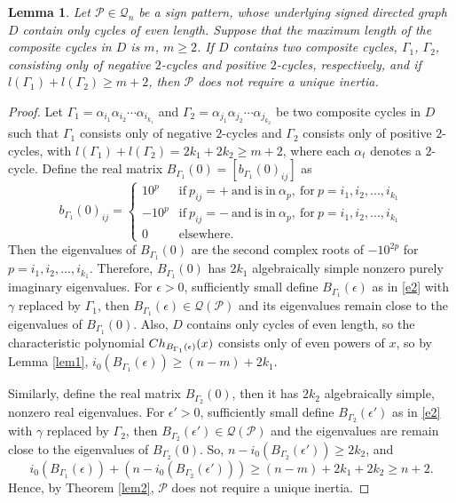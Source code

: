 \documentclass[10pt,a4paper]{amsart}
\newtheorem{lemma}{Lemma}[section]
\numberwithin{equation}{section}
\def\Ch{{\rm Ch}}
\begin{document}
\begin{lemma}\label{xnl2}
	Let $\mathcal{P} \in \mathcal{Q}_n$ be a sign pattern, whose underlying signed directed graph $D$ contain only cycles of even length. Suppose that the maximum length of the composite cycles in $D$ is $m$, $m \geq 2$. If $D$ contains two composite cycles, $\Gamma_1$, $\Gamma_2$, consisting only of negative $2$-cycles and positive $2$-cycles, respectively, and if $l(\Gamma_1)+l(\Gamma_2)\geq m+2$, then $\mathcal{P}$ does not require a unique inertia.
\end{lemma}
\begin{proof}
	Let $\Gamma_1 = \alpha_{i_1} \alpha_{i_2} \cdots \alpha_{i_{k_1}}$ and $\Gamma_2 = \alpha_{j_1} \alpha_{j_2} \cdots \alpha_{j_{k_2}}$ be two composite cycles in $D$ such that $\Gamma_1$ consists only of negative $2$-cycles and $\Gamma_2$ consists only of positive $2$-cycles, with $l(\Gamma_1)+l(\Gamma_2)=2k_1+2k_2\geq m+2$, where each $\alpha_t$ denotes a $2$-cycle.   Define the real matrix $B_{\Gamma_1}(0)=[b_{\Gamma_1}(0)_{ij}]$ as
	$$b_{\Gamma_1}(0)_{ij}= \begin{cases}
		10^p & \text{if}\ p_{ij}=+~\text{and}~ \text{is}~
		\text{in}~ \alpha_p,~\text{for}~p=i_1,i_2,...,i_{k_1} \\
		-10^p & \text{if}\ p_{ij}=-~\text{and}~ \text{is}~ \text{in}~ \alpha_p,~\text{for}~p=i_1,i_2,...,i_{k_1} \\
		
		0 & \text{elsewhere.}
	\end{cases}$$
	Then the eigenvalues of $B_{\Gamma_1}(0)$ are the second complex roots of $-10^{2p}$ for $p=i_1,i_2,...,i_{k_1}$. Therefore, %
	$B_{\Gamma_1}(0)$ has $2k_1$ algebraically simple nonzero purely imaginary eigenvalues. For $\epsilon>0$, sufficiently small define $B_{\Gamma_1}(\epsilon)$ as in \eqref{e2} with $\gamma$ replaced by $\Gamma_1$, then $B_{\Gamma_1}(\epsilon)\in \mathcal{Q}(\mathcal{P})$ and its eigenvalues remain close to the eigenvalues of $B_{\Gamma_1}(0)$. Also, $D$ contains only cycles of even length, so the characteristic polynomial $\Ch_{B_{\Gamma_1}(\epsilon)}(x)$ consists only of even powers of $x$, so by Lemma \ref{lem1}, $i_0(B_{\Gamma_1}(\epsilon))\geq (n-m)+2k_1$.
	
	Similarly, define the real matrix $B_{\Gamma_2}(0)$, then it has $2k_2$ algebraically simple, nonzero real eigenvalues. For $\epsilon'>0$, sufficiently small define $B_{\Gamma_2}(\epsilon')$ as in \eqref{e2} with $\gamma$ replaced by $\Gamma_2$, then $B_{\Gamma_2}(\epsilon')\in \mathcal{Q}(\mathcal{P})$ and the eigenvalues are remain close to the eigenvalues of $B_{\Gamma_2}(0)$. So, $n-i_0(B_{\Gamma_2}(\epsilon'))\geq 2k_2$, and $$i_0(B_{\Gamma_1}(\epsilon))+(n-i_0(B_{\Gamma_2}(\epsilon')))\geq (n-m)+2k_1+2k_2\geq n+2.$$ Hence, by Theorem \ref{lem2}, $\mathcal{P}$ does not require a unique inertia.
\end{proof}
\end{document}
